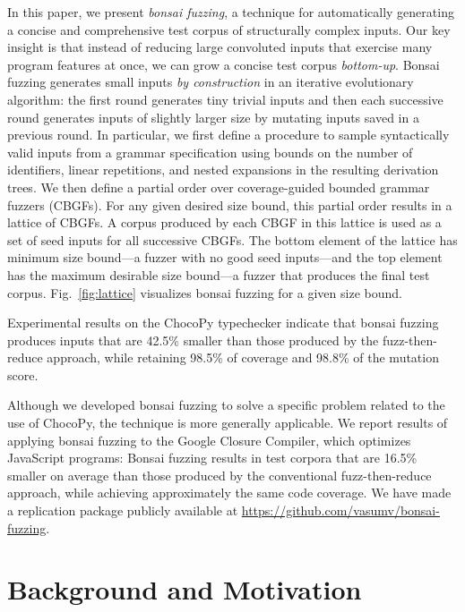 \documentclass[conference]{IEEEtran}
\newcommand{\tech}{bonsai fuzzing} \newcommand{\Tech}{Bonsai fuzzing} \newcommand{\TECH}{Bonsai Fuzzing}
\begin{document}
In this paper, we present \emph{\tech{}}, a technique for automatically generating a concise and comprehensive test corpus of structurally complex inputs. Our key insight is that instead of reducing large convoluted inputs that exercise many program features at once, we can grow a concise test corpus \emph{bottom-up}. \Tech{} generates small inputs \emph{by construction} in an iterative evolutionary algorithm: the first round generates tiny trivial inputs and then each successive round generates inputs of slightly larger size by mutating inputs saved in a previous round. In particular, we first define a procedure to sample syntactically valid inputs from a grammar specification using bounds on the number of identifiers, linear repetitions, and nested expansions in the resulting derivation trees. We then define a partial order over coverage-guided bounded grammar fuzzers (CBGFs). For any given desired size bound, this partial order results in a lattice of CBGFs. A corpus produced by each CBGF in this lattice is used as a set of seed inputs for all successive CBGFs. The bottom element of the lattice has minimum size bound---a fuzzer with no good seed inputs---and the top element has the maximum desirable size bound---a fuzzer that produces the final test corpus. Fig.~\ref{fig:lattice} visualizes \tech{} for a given size bound.



Experimental results on the ChocoPy typechecker indicate that \tech{} produces inputs that are 42.5\% smaller than those produced by the fuzz-then-reduce approach, while retaining 98.5\% of coverage and 98.8\% of the mutation score.

Although we developed \tech{} to solve a specific problem related to the use of ChocoPy, the technique is more generally applicable. We report results of applying \tech{} to the Google Closure Compiler, which optimizes JavaScript programs: \Tech{} results in test corpora that are 16.5\% smaller on average than those produced by the conventional fuzz-then-reduce approach, while achieving approximately the same code coverage. We have made a replication package publicly available at \textcolor{blue}{ \href{https://github.com/vasumv/bonsai-fuzzing}{https://github.com/vasumv/bonsai-fuzzing}}. \section{Background and Motivation}
\label{sec:background-motivation}
\end{document}
